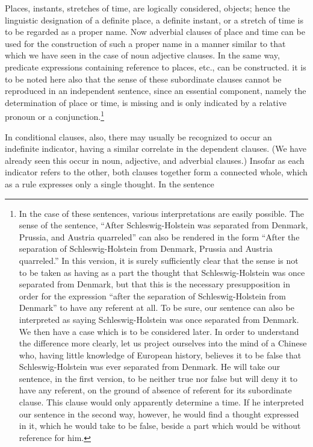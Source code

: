 \documentclass[twoside,12pt,a4paper]{article}
\begin{document}
Places, instants, stretches of time, are logically considered,
objects; hence the linguistic designation of a definite place, a
definite instant, or a stretch of time is to be regarded as a proper
name. Now adverbial clauses of place and time can be used for the
construction of such a proper name in a manner similar to that which
we have seen in the case of noun adjective clauses. In the same way,
predicate expressions containing reference to places, etc., can be
constructed. it is to be noted here also that the sense of these
subordinate clauses cannot be reproduced in an independent sentence,
since an essential component, namely the determination of place or
time, is missing and is only indicated by a relative pronoun or a
conjunction.\footnote[10]{In the case of these sentences, various
  interpretations are easily possible. The sense of the sentence,
  ``After Schleswig-Holstein was separated from Denmark, Prussia, and
  Austria quarreled'' can also be rendered in the form ``After the
  separation of Schleswig-Holstein from Denmark, Prussia and Austria
  quarreled.'' In this version, it is surely sufficiently clear that
  the sense is not to be taken as having as a part the thought that
  Schleswig-Holstein was once separated from Denmark, but that this is
  the necessary presupposition in order for the expression ``after the
  separation of Schleswig-Holstein from Denmark'' to have any referent
  at all. To be sure, our sentence can also be interpreted as saying
  Schleswig-Holstein was once separated from Denmark. We then have a
  case which is to be considered later. In order to understand the
  difference more clearly, let us project ourselves into the mind of a
  Chinese who, having little knowledge of European history, believes
  it to be false that Schleswig-Holstein was ever separated from
  Denmark. He will take our sentence, in the first version, to be
  neither true nor false but will deny it to have any referent, on the
  ground of absence of referent for its subordinate clause. This clause
  would only apparently determine a time. If he interpreted our
  sentence in the second way, however, he would find a thought
  expressed in it, which he would take to be false, beside a part
  which would be without reference for him.}

In conditional clauses, also, there may usually be recognized to occur
an indefinite indicator, having a similar correlate in the dependent
clauses. (We have already seen this occur in noun, adjective, and
adverbial clauses.) Insofar as each indicator refers to the other,
both clauses together form a connected whole, which as a rule
expresses only a single thought. In the sentence
\end{document}
